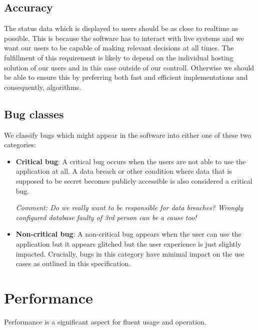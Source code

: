 \documentclass[a4paper,12pt,chapterprefix=false,bibliography=totoc,listof=totoc,]{scrreprt}
\begin{document}
\subsection{Accuracy}
The status data which is displayed to users should be as close to realtime as possible. This is because the software has to interact with live systems and we want our users to be capable of making relevant decisions at all times. The fulfillment of this requirement is likely to depend on the individual hosting solution of our users and in this case outside of our controll. Otherwise we should be able to ensure this by preferring both fast and efficient implementations and consequently, algorithms.

\subsection{Bug classes}
We classify bugs which might appear in the software into either one of these two categories:

\begin{itemize}
    \item {\color{magenta}\textbf{Critical bug}: A critical bug occurs when the users are not able to use the application at all. A data breach or other condition where data that is supposed to be secret becomes publicly accessible is also considered a critical bug.
    	
    	\emph{Comment: Do we really want to be responsible for data breaches? Wrongly configured database faulty of 3rd person can be a cause too!}
    }
    \item \textbf{Non-critical bug}: A non-critical bug appears when the user can use the application but it appears glitched but the user experience is just slightly impacted. Crucially, bugs in this category have minimal impact on the use cases as outlined in this specification.
\end{itemize}

\section{Performance}
Performance is a significant aspect for fluent usage and operation.
\end{document}
